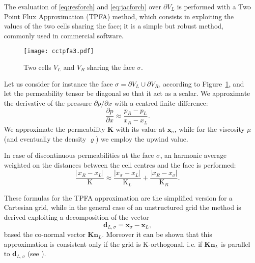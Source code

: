 The evaluation of \eqref{eq:resforch} and \eqref{eq:jacforch} over $\partial 
V_L$ is performed with a Two Point Flux Approximation (TPFA) method, which 
consists in exploiting the values of the two cells sharing the face; it is a 
simple but robust method, commonly used in commercial software.
\begin{figure}
	\centering
	\texttt{[image: cctpfa3.pdf]}
	\caption[Two cells $V_L$ and $V_R$ sharing the face $\sigma$]{Two cells 
	$V_L$ and $V_R$ sharing the face $\sigma$.}
	\label{fig:cctpfa}
\end{figure}
Let us consider for instance the face $\sigma = \partial V_L \cup \partial 
V_R$, according to Figure~\ref{fig:cctpfa}, and let the permeability tensor be 
diagonal so that it act as a scalar. We approximate the derivative of the 
pressure $\partial p /\partial 
x$ with a centred finite difference:
\begin{equation}
\frac{\partial p}{\partial x} \approx \frac{p_R-p_L}{x_R -x_L}.
\end{equation}
We approximate the permeability $\mathbf{K}$ with its value at 
$\mathbf{x}_\sigma$, while 
for the viscosity $\mu$ (and eventually the density $\varrho$) we employ the 
upwind value.

In case of discontinuous permeabilities at the face $\sigma$, an harmonic 
average weighted on the distances between the cell centres and the face is 
performed:
\begin{equation}
\frac{|x_R - x_L|}{\mathrm{K}} \approx 
\frac{|x_\sigma - x_L|}{\mathrm{K}_L}+\frac{|x_R - x_\sigma|}{\mathrm{K}_R}.
\end{equation}

These formulas for the TPFA approximation are the simplified version for a 
Cartesian grid, while in the general case of an unstructured grid the method is 
derived exploiting a decomposition of the vector
\begin{equation}
\mathbf{d}_{L,\sigma}=\mathbf{x}_\sigma - \mathbf{x}_L,
\end{equation}
based the co-normal vector $\mathbf{Kn}_L$. Moreover it 
can be shown that this approximation is consistent only if the grid is 
K-orthogonal, i.e. if $\mathbf{Kn}_L$ is parallel to $\mathbf{d}_{L, \sigma}$ 
(see \cite{tesi:wolff}).
%
